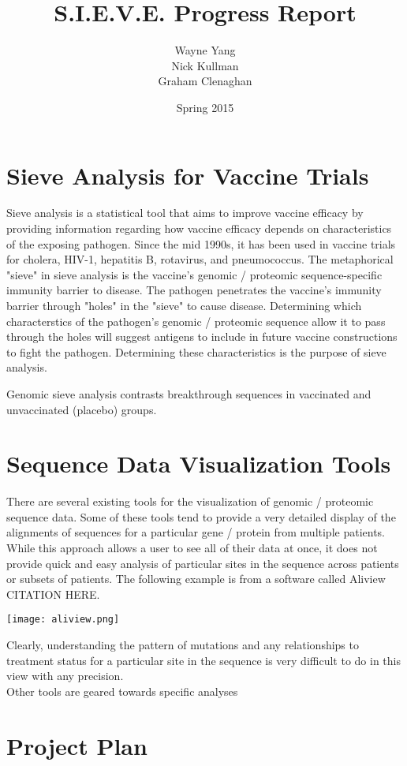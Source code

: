 \documentclass{article}
\begin{document}
\title{S.I.E.V.E. Progress Report}
\author{Wayne Yang \\ Nick Kullman \\ Graham Clenaghan}
\date{Spring 2015}
\maketitle

\section{Sieve Analysis for Vaccine Trials}

Sieve analysis is a statistical tool that aims to improve vaccine efficacy by providing information regarding how vaccine efficacy depends on characteristics of the exposing pathogen. 
Since the mid 1990s, it has been used in vaccine trials for cholera, HIV-1, hepatitis B, rotavirus, and pneumococcus. 
The metaphorical "sieve" in sieve analysis is the vaccine's genomic / proteomic sequence-specific immunity barrier to disease. The pathogen penetrates the vaccine's immunity barrier through "holes" in the "sieve" to cause disease.
Determining which characterstics of the pathogen's genomic / proteomic sequence allow it to pass through the holes will suggest antigens to include in future vaccine constructions to fight the pathogen.
Determining these characteristics is the purpose of sieve analysis. 

Genomic sieve analysis contrasts breakthrough sequences in vaccinated and unvaccinated (placebo) groups.

\section{Sequence Data Visualization Tools}

There are several existing tools for the visualization of genomic / proteomic sequence data.  Some of these tools tend to provide a very detailed display of the alignments of sequences for a particular gene / protein from multiple patients.  While this approach allows a user to see all of their data at once, it does not provide quick and easy analysis of particular sites in the sequence across patients or subsets of patients.  The following example is from a software called Aliview CITATION HERE.

\begin{center}
\texttt{[image: aliview.png]}
\end{center}
Clearly, understanding the pattern of mutations and any relationships to treatment status for a particular site in the sequence is very difficult to do in this view with any precision.
\\
\newline
\noindent Other tools are geared towards specific analyses

\section{Project Plan}
\end{document}
